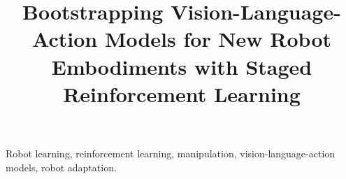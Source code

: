 \documentclass[letterpaper,journal]{IEEEtran}
\begin{document}
\raggedbottom
\title{Bootstrapping Vision-Language-Action Models for New Robot Embodiments with Staged Reinforcement Learning}
\author{}
\IEEEaftertitletext{\vspace{1em}}
\maketitle

\begin{IEEEkeywords}
Robot learning, reinforcement learning, manipulation, vision-language-action models, robot adaptation.
\end{IEEEkeywords}







\end{document}
